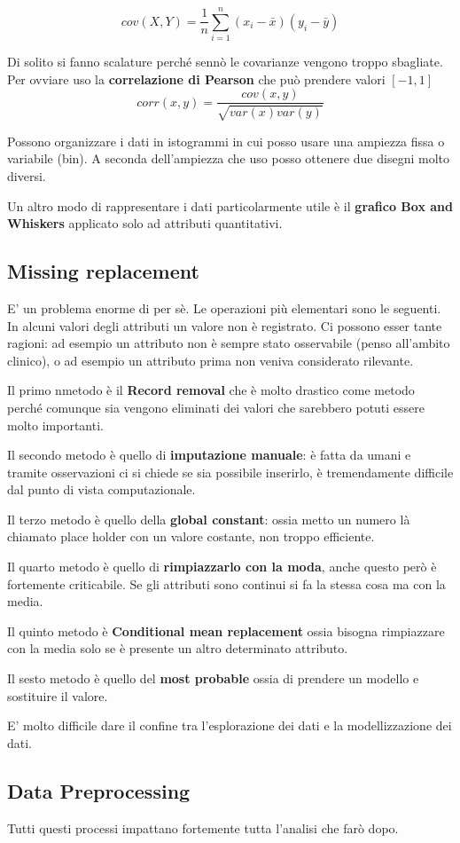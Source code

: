 \[cov(X,Y) = \frac{1}{n}\sum_{i = 1}^{n} (x_{i} - \bar{x})(y_{i} - \bar{y})\]

Di solito si fanno scalature perché sennò le covarianze vengono troppo sbagliate. Per ovviare uso la \textbf{correlazione di Pearson} che può prendere valori $[-1,1]$
\[ corr(x,y) = \frac{cov(x,y)}{\sqrt{var(x)var(y)}}\]

Possono organizzare i dati in istogrammi in cui posso usare una ampiezza fissa o variabile (bin). A seconda dell'ampiezza che uso posso ottenere due disegni molto diversi.

Un altro modo di rappresentare i dati particolarmente utile è il \textbf{grafico Box and Whiskers} applicato solo ad attributi quantitativi.

\subsection{Missing replacement}

E' un problema enorme di per sè. Le operazioni più elementari sono le seguenti. In alcuni valori degli attributi un valore non è registrato. Ci possono esser tante ragioni: ad esempio un attributo non è sempre stato osservabile (penso all'ambito clinico), o ad esempio un attributo prima non veniva considerato rilevante.

Il primo nmetodo è il \textbf{Record removal} che è molto drastico come metodo perché comunque sia vengono eliminati dei valori che sarebbero potuti essere molto importanti.

Il secondo metodo è quello di \textbf{imputazione manuale}: è fatta da umani e tramite osservazioni ci si chiede se sia possibile inserirlo, è tremendamente difficile dal punto di vista computazionale.

Il terzo metodo è quello della \textbf{global constant}: ossia metto un numero là chiamato place holder con un valore costante, non troppo efficiente.

Il quarto metodo è quello di \textbf{rimpiazzarlo con la moda}, anche questo però è fortemente criticabile.
Se gli attributi sono continui si fa la stessa cosa ma con la media.

Il quinto metodo è \textbf{Conditional mean replacement} ossia bisogna rimpiazzare con la media solo se è presente un altro determinato attributo.

Il sesto metodo è quello del \textbf{most probable} ossia di prendere un modello e sostituire il valore.

E' molto difficile dare il confine tra l'esplorazione dei dati e la modellizzazione dei dati.

\subsection{Data Preprocessing}

Tutti questi processi impattano fortemente tutta l'analisi che farò dopo.



